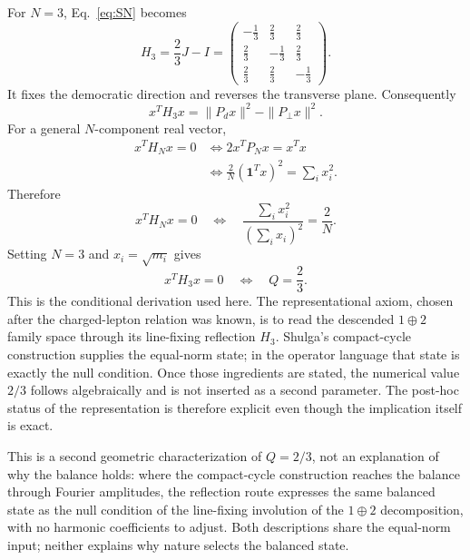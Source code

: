 \documentclass[aps,twocolumn,superscriptaddress,nofootinbib,floatfix]{revtex4-2}
\newcommand{\one}{\bm 1}
\newcommand{\Pd}{P_d}
\newcommand{\Pp}{P_\perp}
\begin{document}
For $N=3$, Eq.~\eqref{eq:SN} becomes
\begin{equation}
H_3=\frac23J-I
=\begin{pmatrix}
-\tfrac13&\tfrac23&\tfrac23\\
\tfrac23&-\tfrac13&\tfrac23\\
\tfrac23&\tfrac23&-\tfrac13
\end{pmatrix}.
\label{eq:S3matrix}
\end{equation}
It fixes the democratic direction and reverses the transverse plane. Consequently
\begin{equation}
x^TH_3x
=\|\Pd x\|^2-\|\Pp x\|^2.
\label{eq:nullform}
\end{equation}
For a general $N$-component real vector,
\begin{align}
x^TH_Nx=0
&\Longleftrightarrow 2x^TP_Nx=x^Tx\\
&\Longleftrightarrow
\frac{2}{N}(\one^Tx)^2=\sum_i x_i^2.
\end{align}
Therefore
\begin{equation}
\boxed{
x^TH_Nx=0
\quad\Longleftrightarrow\quad
\frac{\sum_i x_i^2}{(\sum_i x_i)^2}=\frac{2}{N}.}
\label{eq:generalprop}
\end{equation}
Setting $N=3$ and $x_i=\sqrt{m_i}$ gives
\begin{equation}
\boxed{x^TH_3x=0\quad\Longleftrightarrow\quad Q=\frac23.}
\label{eq:nullmirror}
\end{equation}
This is the conditional derivation used here. The representational axiom, chosen after the charged-lepton relation was known, is to read the descended $1\oplus2$ family space through its line-fixing reflection $H_3$. Shulga's compact-cycle construction supplies the equal-norm state; in the operator language that state is exactly the null condition. Once those ingredients are stated, the numerical value $2/3$ follows algebraically and is not inserted as a second parameter. The post-hoc status of the representation is therefore explicit even though the implication itself is exact.

This is a second geometric characterization of $Q=2/3$, not an explanation of why the balance holds: where the compact-cycle construction reaches the balance through Fourier amplitudes, the reflection route expresses the same balanced state as the null condition of the line-fixing involution of the $1\oplus2$ decomposition, with no harmonic coefficients to adjust. Both descriptions share the equal-norm input; neither explains why nature selects the balanced state.
\end{document}
